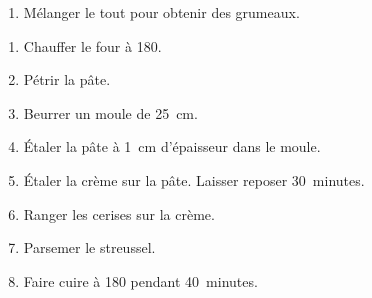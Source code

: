 
\begin{ingredients}
\end{ingredients}


\begin{recipe}
  \begin{enumerate}

  \item Mélanger le tout pour obtenir des grumeaux.

  \end{enumerate}
\end{recipe}


\begin{ingredients}
\end{ingredients}

\begin{recipe}
  \begin{enumerate}

  \item Chauffer le four à 180\degreeC.

  \item Pétrir la pâte.

  \item Beurrer un moule de 25~cm.

  \item Étaler la pâte à 1~cm d'épaisseur dans le moule.

  \item Étaler la crème sur la pâte.  Laisser reposer 30~minutes.

  \item Ranger les cerises sur la crème.

  \item Parsemer le streussel.

  \item Faire cuire à 180\degreeC{} pendant{} 40~minutes.

  \end{enumerate}
\end{recipe}

